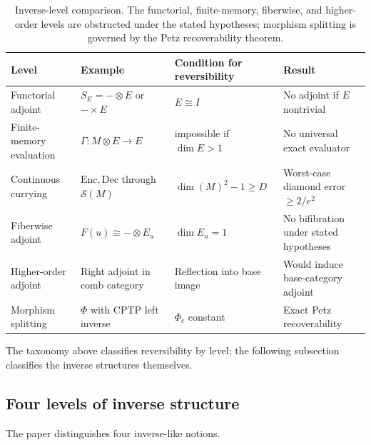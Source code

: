 \documentclass[11pt]{article}
\begin{document}
\begin{table}[htbp]
\centering
\begin{tabularx}{\textwidth}{llLL}
\toprule
Level & Example & Condition for reversibility
& Result \\
\midrule
Functorial adjoint
& $S_E=-\otimes E$ or $-\times E$
& $E\cong I$
& No adjoint if $E$ nontrivial
\\[1mm]
Finite-memory evaluation
& $\Gamma:M\otimes E\to E$
& impossible if $\dim E>1$
& No universal exact evaluator
\\[1mm]
Continuous currying
& $\mathrm{Enc},\mathrm{Dec}$ through $\mathcal S(M)$
& $\dim(M)^2-1\ge D$
& Worst-case diamond error $\ge2/e^2$
\\[1mm]
Fiberwise adjoint
& $F(u)\cong-\otimes E_u$
& $\dim E_u=1$
& No bifibration under stated hypotheses
\\[1mm]
Higher-order adjoint
& Right adjoint in comb category
& Reflection into base image
& Would induce base-category adjoint
\\[1mm]
Morphism splitting
& $\Phi$ with CPTP left inverse
& $\Phi_c$ constant
& Exact Petz recoverability
\\
\bottomrule
\end{tabularx}
\caption{Inverse-level comparison. The functorial, finite-memory,
fiberwise, and higher-order levels are obstructed under the stated
hypotheses; morphism splitting is governed by the Petz recoverability
theorem.}
\label{tab:inverse-levels}
\end{table}

The taxonomy above classifies reversibility by level; the following
subsection classifies the inverse structures themselves.

\subsection{Four levels of inverse structure}

The paper distinguishes four inverse-like notions.
\end{document}
